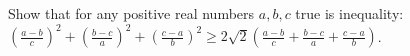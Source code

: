 Show that for any positive real numbers $a, b, c$ true is inequality:
$\left(\frac{a - b}{c}\right)^2 + \left(\frac{b - c}{a}\right)^2 + \left(\frac{c - a}{b}\right)^2 \ge 2\sqrt{2}\left(\frac{a - b}{c} + \frac{b - c}{a} + \frac{c - a}{b} \right)$.